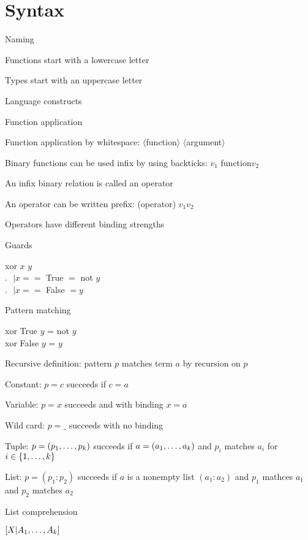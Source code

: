 \section{Syntax}
\enumstart
	\item Naming
	\enumstart
		\item Functions start with a lowercase letter
		\item Types start with an uppercase letter
	\enumend
	\item Language constructs
	\enumstart
		\item Function application
		\enumstart
			\item Function application by whitespace: $\langle$function$\rangle$ $\langle$argument$\rangle$
			\item Binary functions can be used infix by using backticks: $v_1$ \backtick function\backtick $v_2$
			\item An infix binary relation is called an operator
			\item An operator can be written prefix: (operator) $v_1 v_2$
			\item Operators have different binding strengths
		\enumend
		\item Guards
		\enumstart
			\item xor $x$ $y$\\ $.\ \ \ | x ==$ True $=$ not $y$\\ $.\ \ \ | x ==$ False $= y$
		\enumend
		\item Pattern matching
		\enumstart
			\item xor True $y$ = not $y$\\xor False $y$ = $y$
			\item Recursive definition: pattern $p$ matches term $a$ by recursion on $p$
			\enumstart
				\item Constant: $p = c$ succeeds if $c = a$
				\item Variable: $p = x$ succeeds and with binding $x = a$
				\item Wild card: $p = \_$ succeeds with no binding
				\item Tuple: $p = (p_1, \mathellipsis, p_k)$ succeeds if $a = (a_1, \mathellipsis, a_k)$ and $p_i$ matches $a_i$ for $i \in \{1, \mathellipsis, k\}$
				\item List: $p = (p_1 : p_2)$ succeeds if $a$ is a nonempty list $(a_1 : a_2)$ and $p_1$ mathces $a_1$ and $p_2$ matches $a_2$
			\enumend
		\enumend
		\item List comprehension
		\enumstart
			\item $[X | A_1, \mathellipsis, A_k]$
